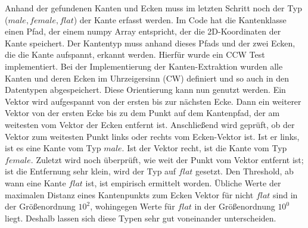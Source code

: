 Anhand der gefundenen Kanten und Ecken muss im letzten Schritt noch der Typ ($male, female, flat$) der Kante erfasst werden. Im Code hat die Kantenklasse einen Pfad, der einem numpy Array entspricht, der die 2D-Koordinaten der Kante speichert. Der Kantentyp muss anhand dieses Pfads und der zwei Ecken, die die Kante aufspannt, erkannt werden. Hierfür wurde ein CCW Test implementiert. Bei der Implementierung der Kanten-Extraktion wurden alle Kanten und deren Ecken im Uhrzeigersinn (CW) definiert und so auch in den Datentypen abgespeichert. Diese Orientierung kann nun genutzt werden. Ein Vektor wird aufgespannt von der ersten bis zur nächsten Ecke. Dann ein weiterer Vektor von der ersten Ecke bis zu dem Punkt auf dem Kantenpfad, der am weitesten vom Vektor der Ecken entfernt ist. Anschließend wird geprüft, ob der Vektor zum weitesten Punkt links oder rechts vom Ecken-Vektor ist. Ist er links, ist es eine Kante vom Typ $male$. Ist der Vektor recht, ist die Kante vom Typ $female$. Zuletzt wird noch überprüft, wie weit der Punkt vom Vektor entfernt ist; ist die Entfernung sehr klein, wird der Typ auf $flat$ gesetzt. Den Threshold, ab wann eine Kante $flat$ ist, ist empirisch ermittelt worden. Übliche Werte der maximalen Distanz eines Kantenpunkts zum Ecken Vektor für nicht $flat$ sind in der Größenordnung $10^2$, wohingegen Werte für $flat$ in der Größenordnung $10^0$ liegt. Deshalb lassen sich diese Typen sehr gut voneinander unterscheiden.

